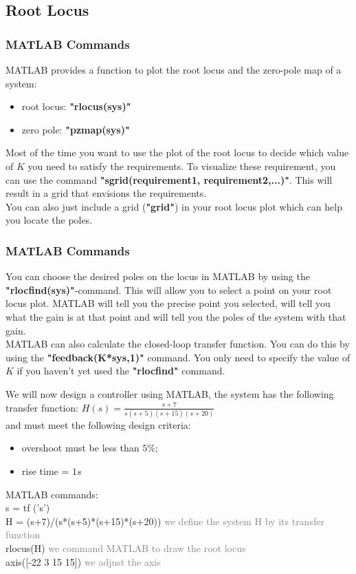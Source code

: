 \subsection{Root Locus}

\begin{frame}
\frametitle{MATLAB Commands}
	MATLAB provides a function to plot the root locus and the zero-pole map of a system:
	\begin{itemize}
		\item root locus: \textbf{"rlocus(sys)"}
		\item zero pole: \textbf{"pzmap(sys)"}
	\end{itemize} 
	\vspace{1em}
	Most of the time you want to use the plot of the root locus to decide which value of $K$ you need to satisfy the requirements. To visualize these requirement, you can use the command \textbf{"sgrid(requirement1, requirement2,...)"}. This will result in a grid that envisions the requirements.\\
	\vspace{1em}
	You can also just include a grid (\textbf{"grid"}) in your root locus plot which can help you locate the poles.
\end{frame}

\begin{frame}
\frametitle{MATLAB Commands}
	You can choose the desired poles on the locus in MATLAB by using the \textbf{"rlocfind(sys)"}-command. This will allow you to select a point on your root locus plot. MATLAB will tell you the precise point you selected, will tell you what the gain is at that point and will tell you the poles of the system with that gain.\\
	\vspace{1em}
	MATLAB can also calculate the closed-loop transfer function. You can do this by using the \textbf{"feedback(K*sys,1)"} command. You only need to specify the value of $K$ if you haven't yet used the \textbf{"rlocfind"} command.
\end{frame}

\begin{frame}
	\begin{example}
		We will now design a controller using MATLAB, the system has the following transfer function: $H(s) = \frac{s+7}{s(s+5)(s+15)(s+20)}$\\
		and must meet the following design criteria: 
		\begin{itemize}
			\item overshoot must be less than $5\%$;
			\item rise time = $1s$
		\end{itemize}
		MATLAB commands:\\
		s = tf ('s') \\
		H = (s+7)/(s*(s+5)*(s+15)*(s+20)) \textcolor{gray}{we define the system H by its transfer function} \\
		rlocus(H) \textcolor{gray}{we command MATLAB to draw the root locus} \\
		axis([-22 3 15 15])	\textcolor{gray}{we adjust the axis} \\
	\end{example}
\end{frame}

